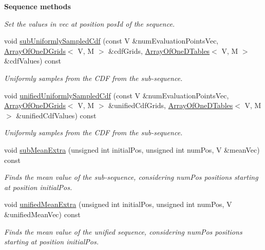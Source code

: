\begin{Indent}{\bf Sequence methods}
\begin{DoxyCompactItemize}
\begin{DoxyCompactList}\small\item\em Set the values in {\ttfamily vec} at position {\ttfamily pos\-Id} of the sequence. \end{DoxyCompactList}\item 
void \hyperlink{class_q_u_e_s_o_1_1_sequence_of_vectors_a959dd10649b28ac896d5e21eab08cfcc}{sub\-Uniformly\-Sampled\-Cdf} (const V \&num\-Evaluation\-Points\-Vec, \hyperlink{class_q_u_e_s_o_1_1_array_of_one_d_grids}{Array\-Of\-One\-D\-Grids}$<$ V, M $>$ \&cdf\-Grids, \hyperlink{class_q_u_e_s_o_1_1_array_of_one_d_tables}{Array\-Of\-One\-D\-Tables}$<$ V, M $>$ \&cdf\-Values) const 
\begin{DoxyCompactList}\small\item\em Uniformly samples from the C\-D\-F from the sub-\/sequence. \end{DoxyCompactList}\item 
void \hyperlink{class_q_u_e_s_o_1_1_sequence_of_vectors_a1dcb5756aa9007bb95cbc528115ac692}{unified\-Uniformly\-Sampled\-Cdf} (const V \&num\-Evaluation\-Points\-Vec, \hyperlink{class_q_u_e_s_o_1_1_array_of_one_d_grids}{Array\-Of\-One\-D\-Grids}$<$ V, M $>$ \&unified\-Cdf\-Grids, \hyperlink{class_q_u_e_s_o_1_1_array_of_one_d_tables}{Array\-Of\-One\-D\-Tables}$<$ V, M $>$ \&unified\-Cdf\-Values) const 
\begin{DoxyCompactList}\small\item\em Uniformly samples from the C\-D\-F from the sub-\/sequence. \end{DoxyCompactList}\item 
void \hyperlink{class_q_u_e_s_o_1_1_sequence_of_vectors_a422147ff61e955c29f62447bf0b4d29c}{sub\-Mean\-Extra} (unsigned int initial\-Pos, unsigned int num\-Pos, V \&mean\-Vec) const 
\begin{DoxyCompactList}\small\item\em Finds the mean value of the sub-\/sequence, considering {\ttfamily num\-Pos} positions starting at position {\ttfamily initial\-Pos}. \end{DoxyCompactList}\item 
void \hyperlink{class_q_u_e_s_o_1_1_sequence_of_vectors_aba06456dee4124f8a3b9de07e0ce2163}{unified\-Mean\-Extra} (unsigned int initial\-Pos, unsigned int num\-Pos, V \&unified\-Mean\-Vec) const 
\begin{DoxyCompactList}\small\item\em Finds the mean value of the unified sequence, considering {\ttfamily num\-Pos} positions starting at position {\ttfamily initial\-Pos}. \end{DoxyCompactList}\item 

\end{DoxyCompactItemize}
\end{Indent}
